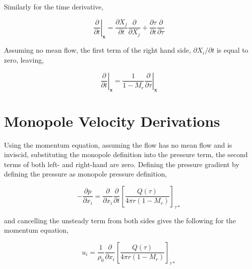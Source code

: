 Similarly for the  time derivative,

\begin{equation*}
    \left. \frac{\partial}{\partial t} \right|_{\textbf{x}} = \frac{\partial X_j}{\partial t} \frac{\partial}{\partial X_j} + \frac{\partial\tau}{\partial t} \frac{\partial}{\partial \tau}
\end{equation*}

Assuming no mean flow, the first term of the right hand side, $\partial X_i/\partial t$ is equal to zero, leaving,

\begin{equation}
    \left. \frac{\partial}{\partial t} \right|_{\textbf{x}} = \frac{1}{1-M_r} \left. \frac{\partial}{\partial \tau} \right|_{\textbf{x}}
    \label{eq:retarded_time_def}
\end{equation}

\chapter{Monopole Velocity Derivations} \label{app:mono_u}
Using the momentum equation, assuming the flow has no mean flow and is inviscid, substituting the monopole definition into the pressure term, the second terms of both left- and right-hand are zero. Defining the pressure gradient by defining the pressure as monopole pressure definition,

\begin{equation*}
    - \frac{\partial p}{\partial x_i} =
    \frac{\partial}{\partial x_i} \frac{\partial}{\partial t} \left[
    \frac{Q(\tau)}{4\pi r (1-M_r)}
    \right]_{\tau*}
\end{equation*}

and cancelling the unsteady term from both sides gives the following for the momentum equation,



\begin{equation}
    u_i = \frac{1}{\rho_0} \frac{\partial}{\partial x_i} \left[ 
    \frac{Q(\tau)}{4\pi r (1-M_r)}
    \right]_{\tau *}
    \label{eq:monopole_spatial_derivative}
\end{equation}

